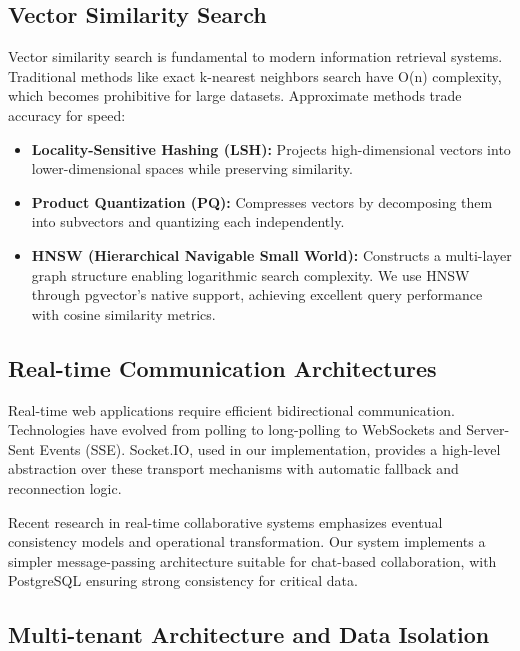 \documentclass[12pt]{report}
\begin{document}
\subsection{Vector Similarity Search}

Vector similarity search is fundamental to modern information retrieval systems. Traditional methods like exact k-nearest neighbors search have O(n) complexity, which becomes prohibitive for large datasets. Approximate methods trade accuracy for speed:

\begin{itemize}
    \item \textbf{Locality-Sensitive Hashing (LSH):} Projects high-dimensional vectors into lower-dimensional spaces while preserving similarity.
    
    \item \textbf{Product Quantization (PQ):} Compresses vectors by decomposing them into subvectors and quantizing each independently.
    
    \item \textbf{HNSW (Hierarchical Navigable Small World):} Constructs a multi-layer graph structure enabling logarithmic search complexity. We use HNSW through pgvector's native support, achieving excellent query performance with cosine similarity metrics.
\end{itemize}

\subsection{Real-time Communication Architectures}

Real-time web applications require efficient bidirectional communication. Technologies have evolved from polling to long-polling to WebSockets and Server-Sent Events (SSE). Socket.IO, used in our implementation, provides a high-level abstraction over these transport mechanisms with automatic fallback and reconnection logic.

Recent research in real-time collaborative systems emphasizes eventual consistency models and operational transformation. Our system implements a simpler message-passing architecture suitable for chat-based collaboration, with PostgreSQL ensuring strong consistency for critical data.

\subsection{Multi-tenant Architecture and Data Isolation}
\end{document}
